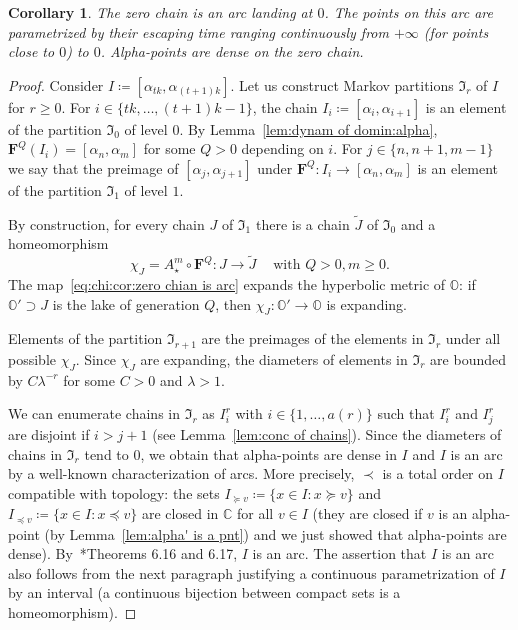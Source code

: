 \documentclass{amsart}
\renewcommand{\sp}{{\ \ }}
\newcommand{\1}{{\mathbb 1 }}
\newcommand\mI{{\mathfrak I}}
\newcommand{\bO}{{\mathbb{O}}}
\newcommand{\bF}{{\mathbf F}}
\newcommand{\str}{{\star}}
\newcommand{\C}{\mathbb{C}}
\newtheorem{cor}[thm]{Corollary}
\theoremstyle{remark}
\numberwithin{equation}{section}
\theoremstyle{definition}
\theoremstyle{nonumberbreak}
\begin{document}
\begin{cor}
\label{cor:zero chian is arc}
The zero chain is an arc landing at $0$. The points on this arc are parametrized by their escaping time ranging continuously from $+\infty$ (for points close to $0$) to $0$. Alpha-points are dense on the zero chain. 
\end{cor}
\begin{proof}
Consider $I\coloneqq [\alpha_{tk},\alpha_{(t+1)k}]$. Let us construct Markov partitions $\mI_r$ of $I$ for $r\ge0$. For $i\in  \{tk,\dots, (t+1)k-1\}$, the chain $I_i\coloneqq [\alpha_{i},\alpha_{i+1}]$ is an element of the partition $\mI_0$ of level $0$. By Lemma~\ref{lem:dynam of domin:alpha}, $\bF^Q(I_i)=[\alpha_n,\alpha_m]$ for some $Q>0$ depending on $i$. For $j\in  \{n,n+1,m-1\}$ we say that the preimage of $[\alpha_j,\alpha_{j+1}]$ under $\bF^Q\colon I_i\to [\alpha_n,\alpha_m]$ is an element of the partition $\mI_1$ of level $1$.


By construction, for every chain $J$ of $\mI_1$ there is a chain $\widetilde J$ of $\mI_0$ and a homeomorphism
\begin{equation}
\label{eq:chi:cor:zero chian is arc}
\chi _J=A_{\str}^{m}\circ \bF^Q\colon J\to \widetilde J\sp \sp \text{ with }Q>0, m\ge0.
\end{equation}
The map~\eqref{eq:chi:cor:zero chian is arc} expands the hyperbolic metric of $\bO$: if $\bO'\supset J$ is the lake of generation $Q$, then $\chi_J\colon \bO'\to \bO$ is expanding. 

 Elements of the partition $\mI_{r+1}$ are the preimages of the elements in $\mI_{r}$ under all possible $\chi_J$. Since $\chi_J$ are expanding, the diameters of elements in $\mI_r$ are bounded by $C \lambda^{-r}$ for some $C>0$ and $\lambda >1$.

We can enumerate chains in $\mI_r$ as $I^r_i$ with $i\in \{1,\dots, a(r)\}$ such that $I^r_i$ and $I^r_j$ are disjoint if $i>j+1$ (see Lemma~\ref{lem:conc of chains}). Since the diameters of chains in $\mI_r$ tend to $0$, we obtain that alpha-points are dense in $I$ and $I$ is an arc by a well-known characterization of arcs. More precisely, $\prec$ is a total order on $I$ compatible with topology: the sets $I_{ \succeq v}\coloneqq \{x \in I : x\succeq v\}$ and $I_{ \preceq v}\coloneqq \{x \in I : x\preceq v\}$ are closed in $\C$ for all $v\in I$ (they are closed if $v$ is an alpha-point (by Lemma~\ref{lem:alpha' is a pnt}) and we just showed that alpha-points are dense). By~\cite{Na}*{Theorems 6.16 and 6.17}, $I$ is an arc. The assertion that $I$ is an arc also follows from the next paragraph justifying a continuous parametrization of $I$ by an interval (a continuous bijection between compact sets is a homeomorphism).


\end{proof}
\end{document}
